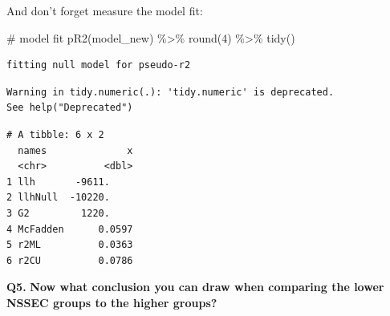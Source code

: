 \documentclass[
  letterpaper,
  DIV=11,
  numbers=noendperiod]{scrreprt}
\newenvironment{Shaded}{\begin{snugshade}}{\end{snugshade}}
\newcommand{\CommentTok}[1]{\textcolor[rgb]{0.37,0.37,0.37}{#1}}
\newcommand{\DecValTok}[1]{\textcolor[rgb]{0.68,0.00,0.00}{#1}}
\newcommand{\FunctionTok}[1]{\textcolor[rgb]{0.28,0.35,0.67}{#1}}
\newcommand{\NormalTok}[1]{\textcolor[rgb]{0.00,0.23,0.31}{#1}}
\newcommand{\SpecialCharTok}[1]{\textcolor[rgb]{0.37,0.37,0.37}{#1}}
\begin{document}
And don't forget measure the model fit:

\begin{Shaded}
\begin{Highlighting}[]
\CommentTok{\# model fit}
\FunctionTok{pR2}\NormalTok{(model\_new) }\SpecialCharTok{\%\textgreater{}\%} \FunctionTok{round}\NormalTok{(}\DecValTok{4}\NormalTok{) }\SpecialCharTok{\%\textgreater{}\%} \FunctionTok{tidy}\NormalTok{()}
\end{Highlighting}
\end{Shaded}

\begin{verbatim}
fitting null model for pseudo-r2
\end{verbatim}

\begin{verbatim}
Warning in tidy.numeric(.): 'tidy.numeric' is deprecated.
See help("Deprecated")
\end{verbatim}

\begin{verbatim}
# A tibble: 6 x 2
  names              x
  <chr>          <dbl>
1 llh       -9611.    
2 llhNull  -10220.    
3 G2         1220.    
4 McFadden      0.0597
5 r2ML          0.0363
6 r2CU          0.0786
\end{verbatim}

\textbf{Q5.} \textbf{Now what conclusion you can draw when comparing the
lower NSSEC groups to the higher groups?}
\end{document}
